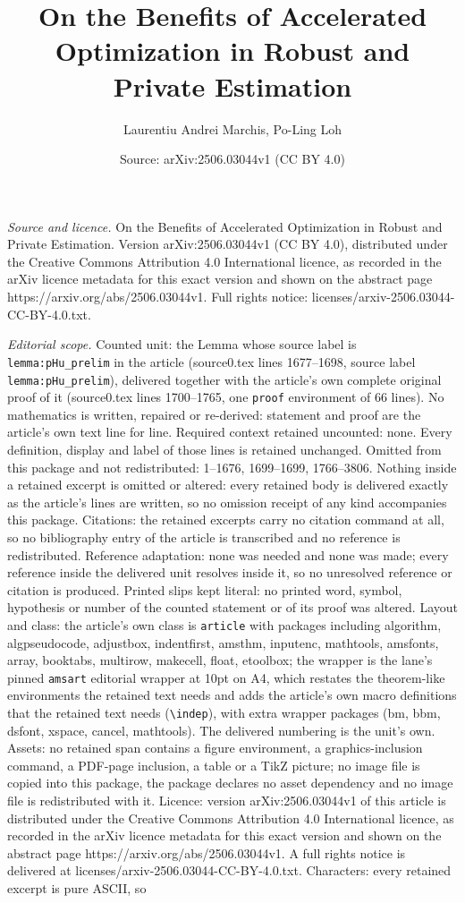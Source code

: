 \documentclass[10pt,a4paper]{amsart}
\title[On the Benefits of Accelerated Optimization in Robust and Pr]{On the Benefits of Accelerated Optimization in Robust and Private Estimation}
\author{Laurentiu Andrei Marchis, Po-Ling Loh}
\date{Source: arXiv:2506.03044v1 (CC BY 4.0)}
\begin{document}
\maketitle

\noindent\emph{Source and licence.} On the Benefits of Accelerated Optimization in Robust and Private Estimation. Version arXiv:2506.03044v1 (CC BY 4.0), distributed under the Creative Commons Attribution 4.0 International licence, as recorded in the arXiv licence metadata for this exact version and shown on the abstract page https://arxiv.org/abs/2506.03044v1. Full rights notice: licenses/arxiv-2506.03044-CC-BY-4.0.txt.\par\smallskip

\noindent\textit{Editorial scope.} Counted unit: the Lemma whose source label is \texttt{lemma:pHu\_prelim} in the article (source0.tex lines 1677--1698, source label \texttt{lemma:pHu\_prelim}), delivered together with the article's own complete original proof of it (source0.tex lines 1700--1765, one \texttt{proof} environment of 66 lines). No mathematics is written, repaired or re-derived: statement and proof are the article's own text line for line. Required context retained uncounted: none. Every definition, display and label of those lines is retained unchanged. Omitted from this package and not redistributed: 1--1676, 1699--1699, 1766--3806. Nothing inside a retained excerpt is omitted or altered: every retained body is delivered exactly as the article's lines are written, so no omission receipt of any kind accompanies this package. Citations: the retained excerpts carry no citation command at all, so no bibliography entry of the article is transcribed and no reference is redistributed. Reference adaptation: none was needed and none was made; every reference inside the delivered unit resolves inside it, so no unresolved reference or citation is produced. Printed slips kept literal: no printed word, symbol, hypothesis or number of the counted statement or of its proof was altered. Layout and class: the article's own class is \texttt{article} with packages including algorithm, algpseudocode, adjustbox, indentfirst, amsthm, inputenc, mathtools, amsfonts, array, booktabs, multirow, makecell, float, etoolbox; the wrapper is the lane's pinned \texttt{amsart} editorial wrapper at 10pt on A4, which restates the theorem-like environments the retained text needs and adds the article's own macro definitions that the retained text needs (\texttt{\textbackslash indep}), with extra wrapper packages (bm, bbm, dsfont, xspace, cancel, mathtools). The delivered numbering is the unit's own. Assets: no retained span contains a figure environment, a graphics-inclusion command, a PDF-page inclusion, a table or a TikZ picture; no image file is copied into this package, the package declares no asset dependency and no image file is redistributed with it. Licence: version arXiv:2506.03044v1 of this article is distributed under the Creative Commons Attribution 4.0 International licence, as recorded in the arXiv licence metadata for this exact version and shown on the abstract page https://arxiv.org/abs/2506.03044v1. A full rights notice is delivered at licenses/arxiv-2506.03044-CC-BY-4.0.txt. Characters: every retained excerpt is pure ASCII, so 
\end{document}

